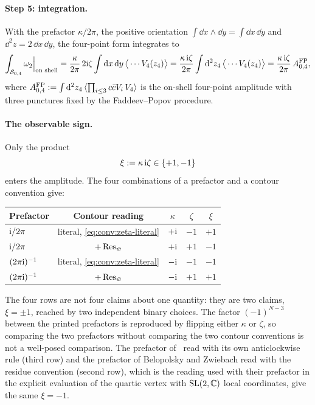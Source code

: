\paragraph{Step 5: integration.}
With the prefactor $\kappa / 2\pi$, the positive orientation $\int \dd x \wedge \dd y = \int \dd x \, \dd y$ and $\dd^2 z = 2 \, \dd x \, \dd y$, the four-point form integrates to
\begin{equation}
  \label{eq:conv:measure-N4}
  \int_{{\mathcal{S}}_{0,4}} \omega_2 \Big\vert_{\text{on shell}}
    = \frac{\kappa}{2\pi} \, 2 \mathrm{i} \zeta \int \mathrm{d} x \, \mathrm{d} y \, \big\langle \cdots V_4(z_4) \big\rangle
    = \frac{\kappa \, \mathrm{i} \zeta}{2\pi} \int \mathrm{d}^2 z_4 \, \big\langle \cdots V_4(z_4) \big\rangle
    = \frac{\kappa \, \mathrm{i} \zeta}{2\pi} \, A^{\rm FP}_{0,4},
\end{equation}
where $A^{\rm FP}_{0,4} := \int \mathrm{d}^2 z_4 \, \langle \prod_{i \le 3} c \bar c V_i \, V_4 \rangle$ is the on-shell four-point amplitude with three punctures fixed by the Faddeev--Popov procedure.

\paragraph{The observable sign.}
Only the product
\begin{equation}
  \label{eq:conv:xi}
  \xi
    := \kappa \, \mathrm{i} \zeta
    \in \{ +1, -1 \}
\end{equation}
enters the amplitude.
The four combinations of a prefactor and a contour convention give:
\begin{center}
  \begin{tabular}{lcccc}
    \toprule
    Prefactor & Contour reading & $\kappa$ & $\zeta$ & $\xi$ \\
    \midrule
    $\mathrm{i} / 2\pi$~\cite{Belopolsky:1995:OffshellClosedString} & literal, \eqref{eq:conv:zeta-literal} & $+ \mathrm{i}$ & $-1$ & $+1$ \\
    $\mathrm{i} / 2\pi$~\cite{Belopolsky:1995:OffshellClosedString} & $+ \operatorname{Res}_{\bar w}$ & $+ \mathrm{i}$ & $+1$ & $-1$ \\
    $(2\pi \mathrm{i})^{-1}$~\cite{Erbin:2021:StringFieldTheory} & literal, \eqref{eq:conv:zeta-literal} & $- \mathrm{i}$ & $-1$ & $-1$ \\
    $(2\pi \mathrm{i})^{-1}$~\cite{Erbin:2021:StringFieldTheory} & $+ \operatorname{Res}_{\bar w}$ & $- \mathrm{i}$ & $+1$ & $+1$ \\
    \bottomrule
  \end{tabular}
\end{center}
The four rows are not four claims about one quantity: they are two claims, $\xi = \pm 1$, reached by two independent binary choices.
The factor $(-1)^{N-3}$ between the printed prefactors is reproduced by flipping either $\kappa$ or $\zeta$, so comparing the two prefactors without comparing the two contour conventions is not a well-posed comparison.
The prefactor of~\cite{Erbin:2021:StringFieldTheory} read with its own anticlockwise rule (third row) and the prefactor of Belopolsky and Zwiebach read with the residue convention (second row), which is the reading used with their prefactor in the explicit evaluation of the quartic vertex with $\mathrm{SL}(2, \mathbb{C})$ local coordinates, give the same $\xi = -1$.

